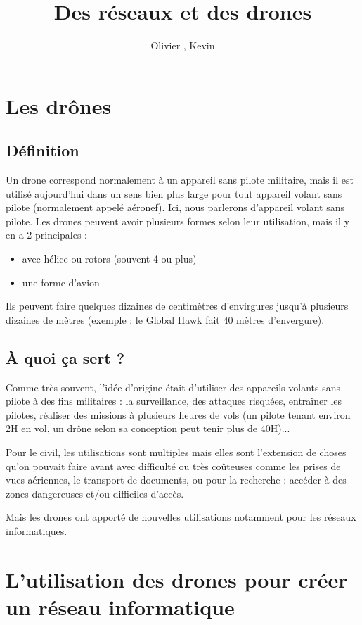 \documentclass[a4paper,11pt]{report}
\title{Des réseaux et des drones}
\author{Olivier \bsc{Boissard}, Kevin \bsc{Boulala}}
\date{}
\begin{document}
\maketitle
\tableofcontents

\chapter{Les drônes}
\section{Définition}
Un drone correspond normalement à un appareil sans pilote militaire, mais il est utilisé aujourd'hui dans un sens bien plus large pour tout appareil volant sans pilote (normalement appelé aéronef). Ici, nous parlerons d'appareil volant sans pilote. Les drones peuvent avoir plusieurs formes selon leur utilisation, mais il y en a 2 principales :
\begin{itemize}
  \item avec hélice ou rotors (souvent 4 ou plus)
  \item une forme d'avion
\end{itemize}
Ils peuvent faire quelques dizaines de centimètres d'envirgures jusqu'à plusieurs dizaines de mètres (exemple : le Global Hawk fait 40 mètres d'envergure).

\section{À quoi ça sert ?}
Comme très souvent, l'idée d'origine était d'utiliser des appareils volants sans pilote à des fins militaires : la surveillance, des attaques risquées, entraîner les pilotes, réaliser des missions à plusieurs heures de vols (un pilote tenant environ 2H en vol, un drône selon sa conception peut tenir plus de 40H)...

Pour le civil, les utilisations sont multiples mais elles sont l'extension de choses qu'on pouvait faire avant avec difficulté ou très coûteuses comme les prises de vues aériennes, le transport de documents, ou pour la recherche : accéder à des zones dangereuses et/ou difficiles d'accès.

Mais les drones ont apporté de nouvelles utilisations notamment pour les réseaux informatiques.

\chapter{L'utilisation des drones pour créer un réseau informatique}
\end{document}
